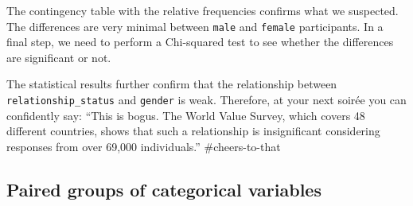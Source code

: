 \documentclass[
]{book}
\newenvironment{Shaded}{\begin{snugshade}}{\end{snugshade}}
\newcommand{\AttributeTok}[1]{\textcolor[rgb]{0.77,0.63,0.00}{#1}}
\newcommand{\CommentTok}[1]{\textcolor[rgb]{0.56,0.35,0.01}{\textit{#1}}}
\newcommand{\DocumentationTok}[1]{\textcolor[rgb]{0.56,0.35,0.01}{\textbf{\textit{#1}}}}
\newcommand{\FunctionTok}[1]{\textcolor[rgb]{0.00,0.00,0.00}{#1}}
\newcommand{\NormalTok}[1]{#1}
\newcommand{\OtherTok}[1]{\textcolor[rgb]{0.56,0.35,0.01}{#1}}
\newcommand{\SpecialCharTok}[1]{\textcolor[rgb]{0.00,0.00,0.00}{#1}}
\newcommand{\StringTok}[1]{\textcolor[rgb]{0.31,0.60,0.02}{#1}}
\begin{document}
The contingency table with the relative frequencies confirms what we suspected. The differences are very minimal between \texttt{male} and \texttt{female} participants. In a final step, we need to perform a Chi-squared test to see whether the differences are significant or not.

\begin{Shaded}
\end{Shaded}

The statistical results further confirm that the relationship between \texttt{relationship\_status} and \texttt{gender} is weak. Therefore, at your next soirée you can confidently say: ``This is bogus. The World Value Survey, which covers 48 different countries, shows that such a relationship is insignificant considering responses from over 69,000 individuals.'' \#cheers-to-that

\hypertarget{paired-groups-categorical-variables}{%
\subsection{Paired groups of categorical variables}\label{paired-groups-categorical-variables}}
\end{document}
